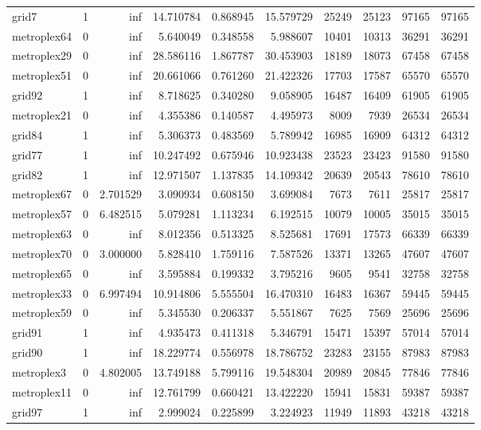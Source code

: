 \begin{longtable}{|l|r|r|r|r|r|r|r|r|r|}
grid7 & 1 & inf & 14.710784 & 0.868945 & 15.579729 & 25249 & 25123 & 97165 & 97165 \\
metroplex64 & 0 & inf & 5.640049 & 0.348558 & 5.988607 & 10401 & 10313 & 36291 & 36291 \\
metroplex29 & 0 & inf & 28.586116 & 1.867787 & 30.453903 & 18189 & 18073 & 67458 & 67458 \\
metroplex51 & 0 & inf & 20.661066 & 0.761260 & 21.422326 & 17703 & 17587 & 65570 & 65570 \\
grid92 & 1 & inf & 8.718625 & 0.340280 & 9.058905 & 16487 & 16409 & 61905 & 61905 \\
metroplex21 & 0 & inf & 4.355386 & 0.140587 & 4.495973 & 8009 & 7939 & 26534 & 26534 \\
grid84 & 1 & inf & 5.306373 & 0.483569 & 5.789942 & 16985 & 16909 & 64312 & 64312 \\
grid77 & 1 & inf & 10.247492 & 0.675946 & 10.923438 & 23523 & 23423 & 91580 & 91580 \\
grid82 & 1 & inf & 12.971507 & 1.137835 & 14.109342 & 20639 & 20543 & 78610 & 78610 \\
metroplex67 & 0 & 2.701529 & 3.090934 & 0.608150 & 3.699084 & 7673 & 7611 & 25817 & 25817 \\
metroplex57 & 0 & 6.482515 & 5.079281 & 1.113234 & 6.192515 & 10079 & 10005 & 35015 & 35015 \\
metroplex63 & 0 & inf & 8.012356 & 0.513325 & 8.525681 & 17691 & 17573 & 66339 & 66339 \\
metroplex70 & 0 & 3.000000 & 5.828410 & 1.759116 & 7.587526 & 13371 & 13265 & 47607 & 47607 \\
metroplex65 & 0 & inf & 3.595884 & 0.199332 & 3.795216 & 9605 & 9541 & 32758 & 32758 \\
metroplex33 & 0 & 6.997494 & 10.914806 & 5.555504 & 16.470310 & 16483 & 16367 & 59445 & 59445 \\
metroplex59 & 0 & inf & 5.345530 & 0.206337 & 5.551867 & 7625 & 7569 & 25696 & 25696 \\
grid91 & 1 & inf & 4.935473 & 0.411318 & 5.346791 & 15471 & 15397 & 57014 & 57014 \\
grid90 & 1 & inf & 18.229774 & 0.556978 & 18.786752 & 23283 & 23155 & 87983 & 87983 \\
metroplex3 & 0 & 4.802005 & 13.749188 & 5.799116 & 19.548304 & 20989 & 20845 & 77846 & 77846 \\
metroplex11 & 0 & inf & 12.761799 & 0.660421 & 13.422220 & 15941 & 15831 & 59387 & 59387 \\
grid97 & 1 & inf & 2.999024 & 0.225899 & 3.224923 & 11949 & 11893 & 43218 & 43218 \\

\end{longtable}
